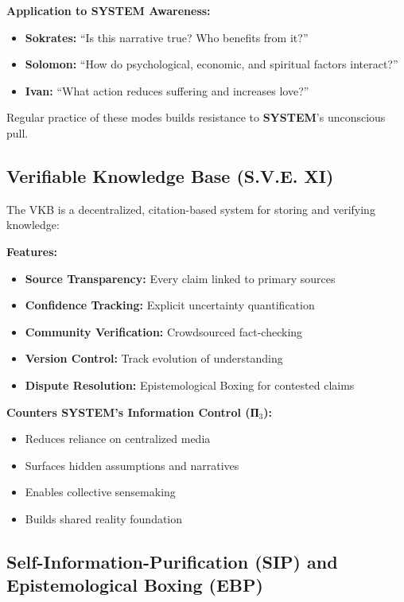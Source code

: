 \documentclass[11pt,a4paper]{article}
\newcommand{\SYSTEM}{\textbf{SYSTEM}}
\theoremstyle{definition}
\theoremstyle{remark}
\begin{document}
\textbf{Application to \SYSTEM{} Awareness:}
\begin{itemize}
    \item \textbf{Sokrates:} ``Is this narrative true? Who benefits from it?''
    \item \textbf{Solomon:} ``How do psychological, economic, and spiritual factors interact?''
    \item \textbf{Ivan:} ``What action reduces suffering and increases love?''
\end{itemize}

Regular practice of these modes builds resistance to \SYSTEM{}'s unconscious pull.

\subsection{Verifiable Knowledge Base (S.V.E. XI)}

The VKB \cite{sve11} is a decentralized, citation-based system for storing and verifying knowledge:

\textbf{Features:}
\begin{itemize}
    \item \textbf{Source Transparency:} Every claim linked to primary sources
    \item \textbf{Confidence Tracking:} Explicit uncertainty quantification
    \item \textbf{Community Verification:} Crowdsourced fact-checking
    \item \textbf{Version Control:} Track evolution of understanding
    \item \textbf{Dispute Resolution:} Epistemological Boxing for contested claims
\end{itemize}

\textbf{Counters \SYSTEM{}'s Information Control (П$_3$):}
\begin{itemize}
    \item Reduces reliance on centralized media
    \item Surfaces hidden assumptions and narratives
    \item Enables collective sensemaking
    \item Builds shared reality foundation
\end{itemize}

\subsection{Self-Information-Purification (SIP) and Epistemological Boxing (EBP)}
\end{document}
